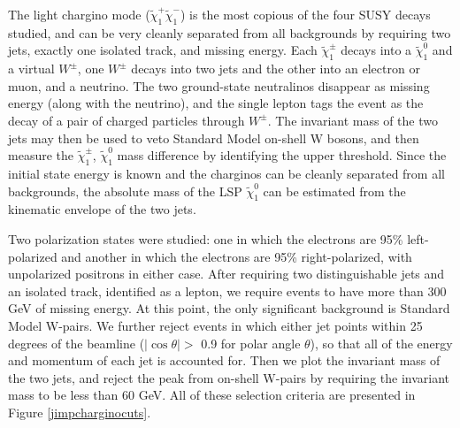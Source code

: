 \documentclass[12pt]{article}
\begin{document}
\bigskip

The light chargino mode ($\tilde{\chi}^+_1 \tilde{\chi}^-_1$) is the
most copious of the four SUSY decays studied, and can be very cleanly
separated from all backgrounds by requiring two jets, exactly one
isolated track, and missing energy.  Each $\tilde{\chi}^\pm_1$ decays
into a $\tilde{\chi}^0_1$ and a virtual $W^\pm$, one $W^\pm$ decays
into two jets and the other into an electron or muon, and a neutrino.
The two ground-state neutralinos disappear as missing energy (along
with the neutrino), and the single lepton tags the event as the decay
of a pair of charged particles through $W^\pm$.  The invariant mass of
the two jets may then be used to veto Standard Model on-shell W
bosons, and then measure the $\tilde{\chi}^\pm_1$, $\tilde{\chi}^0_1$
mass difference by identifying the upper threshold.  Since the initial
state energy is known and the charginos can be cleanly separated from
all backgrounds, the absolute mass of the LSP $\tilde{\chi}^0_1$
can be estimated from the kinematic envelope of the two jets.

Two polarization states were studied: one in which the electrons are
95\% left-polarized and another in which the electrons are 95\%
right-polarized, with unpolarized positrons in either case.  After
requiring two distinguishable jets and an isolated track, identified
as a lepton, we require events to have more than 300 GeV of missing
energy.  At this point, the only significant background is Standard
Model W-pairs.  We further reject events in which either jet points
within 25 degrees of the beamline ($|\cos\theta| >$ 0.9 for polar
angle $\theta$), so that all of the energy and momentum of each jet is
accounted for.  Then we plot the invariant mass of the two jets, and
reject the peak from on-shell W-pairs by requiring the invariant mass
to be less than 60 GeV.  All of these selection criteria are presented
in Figure \ref{jimpcharginocuts}.
\end{document}

